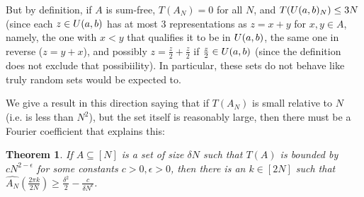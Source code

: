 \documentclass{report}
\newtheorem{theorem}{Theorem}[section]
\theoremstyle{remark}
\numberwithin{equation}{section}
\begin{document}
But by definition, if $A$ is sum-free, $T(A_N) = 0$ for all $N$, and
$T(U(a,b)_N) \leq 3N$ (since each $z \in U(a,b)$ has at most 3
representations as $z = x+y$ for $x,y \in A$, namely, the one with
$x < y$ that qualifies it to be in $U(a,b)$, the same one in
reverse ($z = y+x$), and possibly $z = \frac{z}{2} + \frac{z}{2}$ if
$\frac{z}{2} \in U(a,b)$ (since the definition does not exclude
that possibiility).  In particular, these sets do not behave like
truly random sets would be expected to.  

We give a result in this direction saying that if $T(A_N)$ is small
relative to $N$ (i.e. is less than $N^2$), but the set itself is
reasonably large, then there must be a Fourier coefficient that
explains this: 

\begin{theorem}\label{thm:alpha_finitary}
  If $A \subseteq [N]$ is a set of size $\delta N$ such that $T(A)$ is
  bounded by $c N^{2-\epsilon}$ for some constants
  $c > 0, \epsilon > 0$, then there is an $k \in [2N]$ such that
  $\widehat{A_N}(\frac{2\pi k}{2N}) \geq \frac{\delta^2}{2} -
  \frac{c}{\delta N^\epsilon}$.
\end{theorem}
\end{document}
